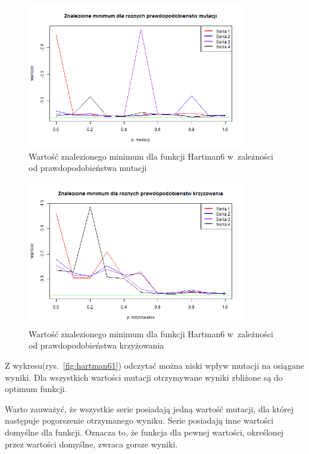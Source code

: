 \documentclass[11pt, a4paper]{article}
\newcommand{\fbi}{\leavevmode{\parindent=1em\indent}}
\begin{document}
\begin{figure}[H]
	\begin{center}
		\includegraphics[width=0.85\textwidth]{./assets/Hartman62.png}
		\caption{Wartość znalezionego minimum dla funkcji Hartman6 w~zależności od prawdopodobieństwa mutacji}
		\label{fig:hartman62}
	\end{center}
\end{figure}

\begin{figure}[H]
	\begin{center}
		\includegraphics[width=0.85\textwidth]{./assets/Hartman63.png}
		\caption{Wartość znalezionego minimum dla funkcji Hartman6 w~zależności od prawdopodobieństwa krzyżowania}
		\label{fig:hartman63}
	\end{center}
\end{figure}

\fbi
Z wykresu(rys.~\ref{fig:hartman61}) odczytać można niski wpływ mutacji na osiągane wyniki. Dla wszystkich wartości mutacji otrzymywane wyniki zbliżone są do optimum funkcji.

\fbi
Warto zauważyć, że wszystkie serie posiadają jedną wartość mutacji, dla której następuje pogorszenie otrzymanego wyniku. Serie posiadają inne wartości domyślne dla funkcji. Oznacza to, że funkcja dla pewnej wartości, określonej przez wartości domyślne, zwraca gorsze wyniki.
\end{document}
